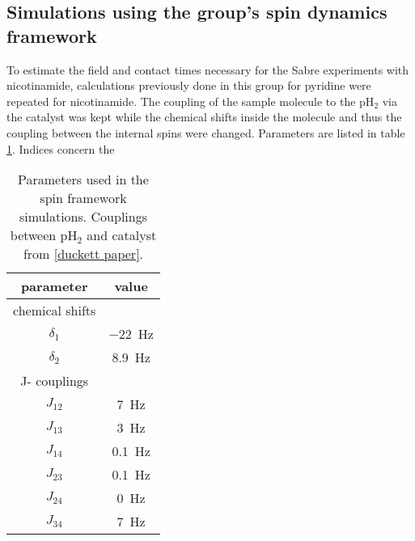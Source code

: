    \subsection{Simulations using the group's spin dynamics framework}
To estimate the field and contact times necessary for the Sabre experiments with nicotinamide, calculations previously done in this group for pyridine \cite{knecht_spin_2014} were repeated for nicotinamide. The coupling of the sample molecule to the pH$_2$ via the catalyst was kept \cite{green_theory_2012-1} while the chemical shifts inside the molecule and thus the coupling between the internal spins were changed. Parameters are listed in table \ref{table:simulations:spinFrameworkParameters}. Indices concern the 
        \begin{table}
        \centering
            \begin{tabular}{|c|c|}
                \hline
                parameter & value\\
                \hline
                chemical shifts & \\
                \hline
                $\delta_1$ & \SI{-22}{\hertz}\\
                $\delta_2$ & \SI{8.9}{\hertz}\\
                \hline
                J- couplings & \\
                \hline
                $J_{12}$ & \SI{7}{\hertz}\\
                $J_{13}$ & \SI{3}{\hertz}\\
                $J_{14}$ & \SI{0.1}{\hertz}\\
                $J_{23}$ & \SI{0.1}{\hertz}\\
                $J_{24}$ & \SI{0}{\hertz}\\
                $J_{34}$ & \SI{7}{\hertz}\\
                \hline
            \end{tabular}
            \caption[Spin framework parameters]{Parameters used in the spin framework simulations. Couplings between pH$_2$ and catalyst from \ref{duckett paper}. }
            \label{table:simulations:spinFrameworkParameters}
        \end{table}
